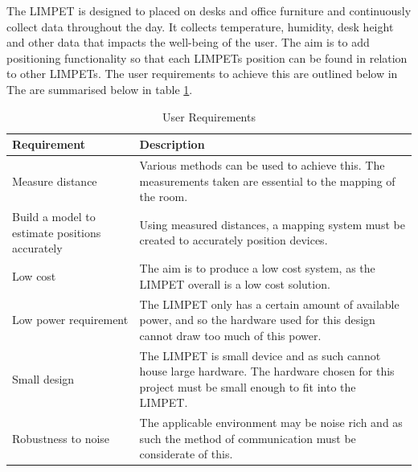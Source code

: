 The LIMPET is designed to placed on desks and office furniture and continuously collect data throughout the day. It collects temperature, humidity, desk height and other data that impacts the well-being of the user. The aim is to add positioning functionality so that each LIMPETs position can be found in relation to other LIMPETs. The user requirements to achieve this are outlined below in The are summarised below in table \ref{tab:user_requirements}. 
\begin{center}
    \begin{table}[H]
    \captionsetup{singlelinecheck = false, format= hang, justification=raggedright, font=footnotesize, labelsep=space}
    \caption{User Requirements}
    \begin{adjustbox}{max width=\textwidth}
    \begin{tabular}{p{5.5cm}p{10.99cm}}
    \hline
    \multicolumn{1}{|p{5.5cm}}{Requirement} & 
    \multicolumn{1}{|p{10.99cm}|}{Description} \\ 
    \hline
    \multicolumn{1}{|p{5.5cm}}{Measure distance } & 
    \multicolumn{1}{|p{10.99cm}|}{Various methods can be used to achieve this. The measurements taken are essential to the mapping of the room.} \\ 
    \hline
    \multicolumn{1}{|p{5.5cm}}{Build a model to estimate positions accurately} & 
    \multicolumn{1}{|p{10.99cm}|}{Using measured distances, a mapping system must be created to accurately position devices.} \\ 
    \hline
    \multicolumn{1}{|p{5.5cm}}{Low cost} & 
    \multicolumn{1}{|p{10.99cm}|}{The aim is to produce a low cost system, as the LIMPET overall is a low cost solution. } \\ 
    \hline
    \multicolumn{1}{|p{5.5cm}}{Low power requirement} & 
    \multicolumn{1}{|p{10.99cm}|}{The LIMPET only has a certain amount of available power, and so the hardware used for this design cannot draw too much of this power.} \\ 
    \hline
    \multicolumn{1}{|p{5.5cm}}{Small design } & 
    \multicolumn{1}{|p{10.99cm}|}{The LIMPET is small device and as such cannot house large hardware. The hardware chosen for this project must be small enough to fit into the LIMPET. } \\ 
    \hline
    \multicolumn{1}{|p{5.5cm}}{Robustness to noise} & 
    \multicolumn{1}{|p{10.99cm}|}{The applicable environment may be noise rich and as such the method of communication must be considerate of this.} \\ 
    \hline
    \end{tabular}
    \end{adjustbox}
    \label{tab:user_requirements}\end{table}
\end{center}
\pagebreak
